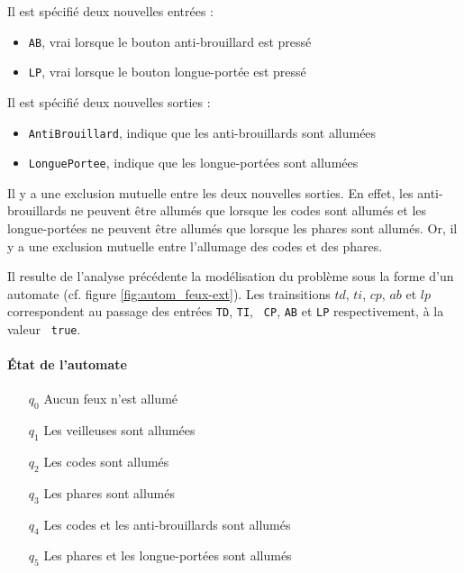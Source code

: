 \documentclass{article}
\begin{document}
      Il est spécifié deux nouvelles entrées :
      \begin{itemize}
        \item {\tt AB}, vrai lorsque le bouton anti-brouillard est pressé
        \item {\tt LP}, vrai lorsque le bouton longue-portée est pressé
      \end{itemize} \vspace{1em}


      Il est spécifié deux nouvelles sorties :
      \begin{itemize}
        \item {\tt AntiBrouillard}, indique que les anti-brouillards sont allumées
        \item {\tt LonguePortee}, indique que les longue-portées sont allumées
      \end{itemize} \vspace{1em}

      Il y a une exclusion mutuelle entre les deux nouvelles
      sorties. En effet, les anti-brouillards ne peuvent être allumés que
      lorsque les codes sont allumés et les longue-portées ne peuvent
      être allumés que lorsque les phares sont allumés. Or, il y a une
      exclusion mutuelle entre l'allumage des codes et des
      phares. \medskip

      Il resulte de l'analyse précédente la modélisation du problème
      sous la forme d'un automate (cf. figure \ref{fig:autom_feux-ext}). Les
      trainsitions $td$, $ti$, $cp$, $ab$ et $lp$
      correspondent au passage des entrées {\tt TD}, {\tt TI}, {\tt
        CP}, {\tt AB} et {\tt LP} respectivement, à la valeur {\tt
        true}.

      \paragraph{État de l'automate}
        \begin{itemize}
          \item[$q_0$] Aucun feux n'est allumé
          \item[$q_1$] Les veilleuses sont allumées
          \item[$q_2$] Les codes sont allumés
          \item[$q_3$] Les phares sont allumés
          \item[$q_4$] Les codes et les anti-brouillards sont allumés
          \item[$q_5$] Les phares et les longue-portées sont allumés
        \end{itemize}
\end{document}
